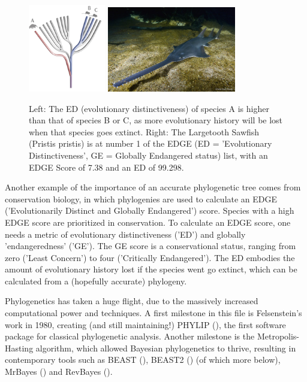 \begin{figure}[H]
  \includegraphics[width=0.3\textwidth]{edge_tree.png}
  \includegraphics[width=0.5\textwidth]{Pristis-pristis_Simon-Fraser-University-1000x667.jpg}
  \caption{
    Left: The ED (evolutionary distinctiveness)       
    of species A is higher than that of species 
    B or C, as more                             
    evolutionary history will be lost when      
    that species goes extinct.
    Right: The Largetooth Sawfish (Pristis pristis) is at number 1 of the 
    EDGE (ED = 'Evolutionary Distinctiveness', GE = Globally Endangered status) 
    list, with an EDGE Score of 7.38 and an ED of 99.298.
 }
  \label{fig:edge_species}
\end{figure}

Another example of the importance of an accurate phylogenetic tree 
comes from conservation biology, in which phylogenies are used to
calculate an EDGE ('Evolutionarily Distinct and Globally Endangered') 
score. Species with a high EDGE score are prioritized in conservation.
To calculate an EDGE score, one needs a metric of evolutionary 
distinctiveness ('ED') and globally 'endangeredness' ('GE').
The GE score is a conservational status, ranging from zero ('Least Concern') 
to four ('Critically Endangered'). 
The ED embodies the amount of evolutionary history lost if the species 
went go extinct, which can be calculated from a (hopefully accurate) 
phylogeny.

Phylogenetics has taken a huge flight, due to the massively increased
computational power and techniques. A first milestone in this file is 
Felsenstein's work in 1980, creating (and still maintaining!) 
PHYLIP (\cite{felsenstein1981evolutionary}), 
the first software package for classical phylogenetic analysis.
Another milestone is the Metropolis-Hasting algorithm, which 
allowed Bayesian phylogenetics to thrive, resulting in
contemporary tools such as BEAST (\cite{beast1}), BEAST2 (\cite{beast2}) (of which more below), 
MrBayes (\cite{mrbayes}) and RevBayes (\cite{revbayes}).

